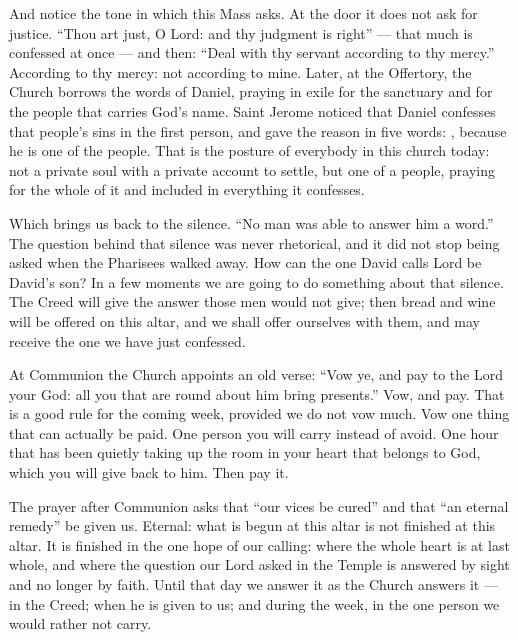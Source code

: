 \bigskip

And notice the tone in which this Mass asks. At the door it does not ask for
justice. ``Thou art just, O Lord: and thy judgment is right'' --- that much
is confessed at once --- and then: ``Deal with thy servant according to thy
mercy.'' According to thy mercy: not according to mine. Later, at the
Offertory, the Church borrows the words of Daniel, praying in exile for
the sanctuary and for the people that carries God's name. Saint Jerome
noticed that Daniel confesses that people's sins in the first person, and
gave the reason in five words: , because he is
one of the people. That is the posture of everybody in this church today: not
a private soul with a private account to settle, but one of a people, praying
for the whole of it and included in everything it confesses.

Which brings us back to the silence. ``No man was able to answer him a
word.'' The question behind that silence was never rhetorical, and it did not
stop being asked when the Pharisees walked away. How can the one David calls
Lord be David's son? In a few moments we are going to do something about that
silence. The Creed will give the answer those men would not give; then bread
and wine will be offered on this altar, and we shall offer ourselves with
them, and may receive the one we have just confessed.

At Communion the Church appoints an old verse: ``Vow ye, and pay to
the Lord your God: all you that are round about him bring presents.'' Vow,
and pay. That is a good rule for the coming week, provided we do not vow
much. Vow one thing that can actually be paid. One person you will carry
instead of avoid. One hour that has been quietly taking up the room in your
heart that belongs to God, which you will give back to him. Then pay it.

The prayer after Communion asks that ``our vices be cured'' and that ``an
eternal remedy'' be given us. Eternal: what is begun at this altar is not
finished at this altar. It is finished in the one hope of our calling: where
the whole heart is at last whole, and where the question our Lord asked in
the Temple is answered by sight and no longer by faith. Until that day we answer it as the Church
answers it --- in the Creed; when he is given to us; and during the week, in
the one person we would rather not carry.

